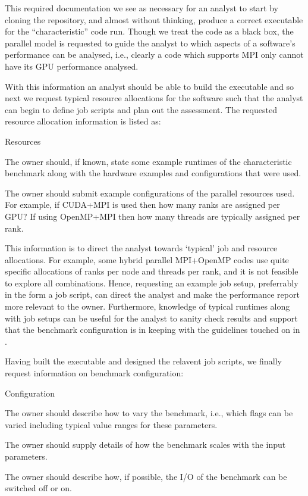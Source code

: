 This required documentation we see as necessary for an analyst to start by cloning the repository, and almost without thinking, produce a correct executable for the ``characteristic'' code run. Though we treat the code as a black box, the parallel model is requested to guide the analyst to which aspects of a software's performance can be analysed, i.e., clearly a code which supports MPI only cannot have its GPU performance analysed.

With this information an analyst should be able to build the executable and so next we request typical resource allocations for the software such that the analyst can begin to define job scripts and plan out the assessment. The requested resource allocation information is listed as:

\begin{checklisttitled}{Resources}
    \item The owner should, if known, state some example runtimes of the characteristic benchmark along with the hardware examples and configurations that were used.
    \item The owner should submit example configurations of the parallel resources used. For example, if CUDA+MPI is used then how many ranks are assigned per GPU? If using OpenMP+MPI then how many threads are typically assigned per rank.
\end{checklisttitled}

This information is to direct the analyst towards `typical' job and resource allocations. For example, some hybrid parallel MPI+OpenMP codes use quite specific allocations of ranks per node and threads per rank, and it is not feasible to explore all combinations. Hence, requesting an example job setup, preferrably in the form a job script, can direct the analyst and make the performance report more relevant to the owner. Furthermore, knowledge of typical runtimes along with job setups can be useful for the analyst to sanity check results and support that the benchmark configuration is in keeping with the guidelines touched on in .

Having built the executable and designed the relavent job scripts, we finally request information on benchmark configuration:

\begin{checklisttitled}{Configuration}
    \item The owner should describe how to vary the benchmark, i.e., which flags can be varied including typical value ranges for these parameters.
    \item The owner should supply details of how the benchmark scales with the input parameters.
    \item The owner should describe how, if possible, the I/O of the benchmark can be switched off or on.
\end{checklisttitled}

